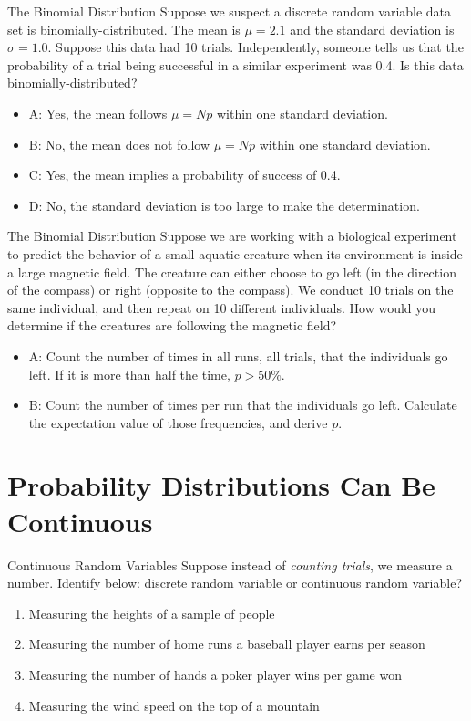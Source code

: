 \documentclass{beamer}
\begin{document}
\begin{frame}{The Binomial Distribution}
Suppose we suspect a discrete random variable data set is binomially-distributed.  The mean is $\mu = 2.1$ and the standard deviation is $\sigma = 1.0$.  Suppose this data had 10 trials.  Independently, someone tells us that the probability of a trial being successful in a similar experiment was 0.4.  Is this data binomially-distributed?
\begin{itemize}
\item A: Yes, the mean follows $\mu = N p$ within one standard deviation.
\item B: No, the mean does not follow $\mu = N p$ within one standard deviation.
\item C: Yes, the mean implies a probability of success of 0.4.
\item D: No, the standard deviation is too large to make the determination.
\end{itemize}
\end{frame}

\begin{frame}{The Binomial Distribution}
Suppose we are working with a biological experiment to predict the behavior of a small aquatic creature when its environment is inside a large magnetic field.  The creature can either choose to go left (in the direction of the compass) or right (opposite to the compass).  We conduct 10 trials on the same individual, and then repeat on 10 different individuals.  How would you determine if the creatures are following the magnetic field?
\begin{itemize}
\item A: Count the number of times in all runs, all trials, that the individuals go left.  If it is more than half the time, $p>50\%$.
\item B: Count the number of times per run that the individuals go left.  Calculate the expectation value of those frequencies, and derive $p$.
\end{itemize}
\end{frame}

\section{Probability Distributions Can Be Continuous}

\begin{frame}{Continuous Random Variables}
Suppose instead of \textit{counting trials}, we measure a number.  Identify below: discrete random variable or continuous random variable?
\begin{enumerate}
\item Measuring the heights of a sample of people
\item Measuring the number of home runs a baseball player earns per season
\item Measuring the number of hands a poker player wins per game won
\item Measuring the wind speed on the top of a mountain
\end{enumerate}
\end{frame}
\end{document}
